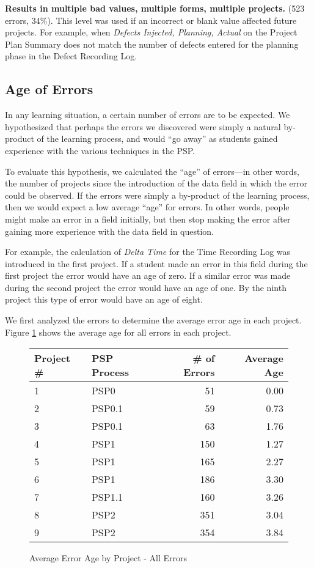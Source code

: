 {\bf Results in multiple bad values, multiple forms, multiple pro\-jects.}
(523 errors, 34\%).  This level was used if an incorrect or blank value
affected future projects.  For example, when {\it Defects Injected,
  Planning, Actual} on the Project Plan Summary does not match the number
of defects entered for the planning phase in the Defect Recording Log.

\subsection {Age of Errors}

In any learning situation, a certain number of errors are to be expected.
We hypothesized that perhaps the errors we discovered were simply a natural
by-product of the learning process, and would ``go away'' as students
gained experience with the various techniques in the PSP.

To evaluate this hypothesis, we calculated the ``age'' of errors---in other
words, the number of projects since the introduction of the data field in
which the error could be observed. If the errors were simply a by-product
of the learning process, then we would expect a low average ``age'' for
errors.  In other words, people might make an error in a field initially,
but then stop making the error after gaining more experience with the data
field in question.

For example, the calculation of {\it Delta Time} for the Time Recording Log
was introduced in the first project.  If a student made an error in this
field during the first project the error would have an age of zero.  If a
similar error was made during the second project the error would have an
age of one.  By the ninth project this type of error would have an age of
eight.
      
We first analyzed the errors to determine the average error age in each
project.  Figure \ref{errorAgeAll} shows the average age for all errors
in each project.

\begin{figure}[htbp]
  \begin{center} 
  \begin{tabular}{|l|l|r|r|}\hline 
  Project \# & PSP Process & \# of Errors & Average Age \\ \hline\hline 
  1 & PSP0    &  51  &  0.00 \\ \hline
  2 & PSP0.1  &  59  &  0.73 \\ \hline    
  3 & PSP0.1  &  63  &  1.76 \\ \hline
  4 & PSP1    & 150  &  1.27 \\ \hline
  5 & PSP1    & 165  &  2.27 \\ \hline
  6 & PSP1    & 186  &  3.30 \\ \hline
  7 & PSP1.1  & 160  &  3.26 \\ \hline
  8 & PSP2    & 351  &  3.04 \\ \hline
  9 & PSP2    & 354  &  3.84 \\ \hline
  \end{tabular}
  \end{center}
  \caption{\label{errorAgeAll}Average Error Age by Project - All Errors} 
  \end{figure}
      
